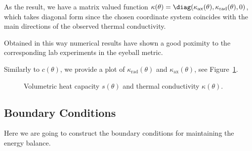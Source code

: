 As the result, we have a matrix valued function $\kappa(\theta) = \diag(\kappa_\text{ax}(\theta), \kappa_\text{rad}(\theta), 0)$, which takes diagonal form since the chosen coordinate system coincides with the main directions of the observed thermal conductivity.



{\color{TolHighContrastBlue}
Obtained in this way numerical results have shown a good poximity to the corresponding lab experiments in the eyeball metric.
}

Similarly to $c(\theta)$, we provide a plot of $\kappa_\text{rad}(\theta)$ and $\kappa_\text{ax}(\theta)$, see Figure~\ref{fig:coef}.

\begin{figure}[ht]
	\centering
	
	
	\caption{Volumetric heat capacity $s(\theta)$ and thermal conductivity $\kappa(\theta)$.}
	\label{fig:coef}
\end{figure}



\subsection{Boundary Conditions}

Here we are going to construct the boundary conditions for maintaining the energy balance.

